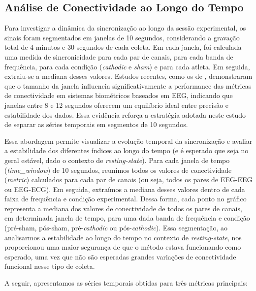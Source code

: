 \begin{itemize}
\section{Análise de Conectividade ao Longo do Tempo}
\label{sec:connectivity_over_time}
Para investigar a dinâmica da sincronização ao longo da sessão experimental, os sinais foram segmentados em janelas de 10 segundos, considerando a gravação total de 4 minutos e 30 segundos de cada coleta. Em cada janela, foi calculada uma medida de sincronicidade para cada par de canais, para cada banda de frequência, para cada condição (\textit{cathodic} e \textit{sham}) e para cada atleta. Em seguida, extraiu-se a mediana desses valores. Estudos recentes, como os de , demonstraram que o tamanho da janela influencia significativamente a performance das métricas de conectividade em sistemas biométricos baseados em EEG, indicando que janelas entre 8 e 12 segundos oferecem um equilíbrio ideal entre precisão e estabilidade dos dados. Essa evidência reforça a estratégia adotada neste estudo de separar as séries temporais em segmentos de 10 segundos.

Essa abordagem permite visualizar a evolução temporal da sincronização e avaliar a estabilidade dos diferentes índices ao longo do tempo (e é esperado que seja no geral estável, dado o contexto de \textit{resting-state}). Para cada janela de tempo (\textit{time\_window}) de 10 segundos, reunimos todos os valores de conectividade (\textit{metric}) calculados para cada par de canais (ou seja, todos os pares de EEG-EEG ou EEG-ECG). Em seguida, extraímos a mediana desses valores dentro de cada faixa de frequência e condição experimental. Dessa forma, cada ponto no gráfico representa a mediana dos valores de conectividade de todos os pares de canais, em determinada janela de tempo, para uma dada banda de frequência e condição (pré-sham, pós-sham, pré-\textit{cathodic} ou pós-\textit{cathodic}). Essa segmentação, ao analisarmos a estabilidade ao longo do tempo no contexto de \textit{resting-state}, nos proporcionou uma maior segurança de que o método estava funcionando como esperado, uma vez que não são esperadas grandes variações de conectividade funcional nesse tipo de coleta.

A seguir, apresentamos as séries temporais obtidas para três métricas principais:


\end{itemize}

